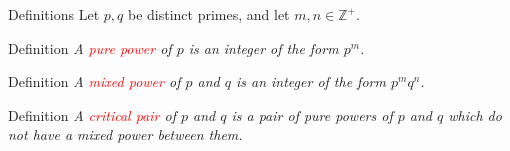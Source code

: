 \documentclass{beamer}
\newcommand{\Z}{{\mathbb Z}}
\newcommand{\redtext}[1]{{\textcolor{red}{#1}}}
\newcommand{\remph}[1]{\redtext{\textit{#1}}}
\begin{document}
\begin{frame}{Definitions}
Let $p,q$ be distinct primes, and let $m,n \in \Z^+$. \\
\begin{block}{Definition}
    \textit{A \remph{pure power} of $p$ is an integer of the form $p^m$.}
\end{block}    
\vspace{.1in} 

\begin{block}{Definition}
    \textit{A \remph{mixed power} of $p$ and $q$ is an integer of the form $p^m q^n$.}
\end{block}   
\vspace{.1in}

\begin{block}{Definition}
    \textit{A \remph{critical pair} of $p$ and $q$ is a pair of pure powers of $p$ and $q$ which do not have a mixed power between them.}
\end{block}    

\end{frame}
\end{document}
